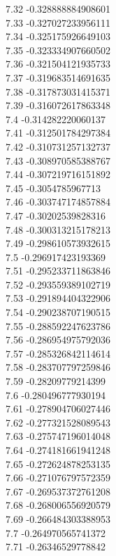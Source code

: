 {7.32	-0.328888884908601\\
7.33	-0.327027233956111\\
7.34	-0.325175926649103\\
7.35	-0.323334907660502\\
7.36	-0.321504121935733\\
7.37	-0.319683514691635\\
7.38	-0.317873031415371\\
7.39	-0.316072617863348\\
7.4	-0.314282220060137\\
7.41	-0.312501784297384\\
7.42	-0.310731257132737\\
7.43	-0.308970585388767\\
7.44	-0.307219716151892\\
7.45	-0.3054785967713\\
7.46	-0.303747174857884\\
7.47	-0.30202539828316\\
7.48	-0.300313215178213\\
7.49	-0.298610573932615\\
7.5	-0.296917423193369\\
7.51	-0.295233711863846\\
7.52	-0.293559389102719\\
7.53	-0.291894404322906\\
7.54	-0.290238707190515\\
7.55	-0.288592247623786\\
7.56	-0.286954975792036\\
7.57	-0.285326842114614\\
7.58	-0.283707797259846\\
7.59	-0.28209779214399\\
7.6	-0.280496777930194\\
7.61	-0.278904706027446\\
7.62	-0.277321528089543\\
7.63	-0.275747196014048\\
7.64	-0.274181661941248\\
7.65	-0.272624878253135\\
7.66	-0.271076797572359\\
7.67	-0.269537372761208\\
7.68	-0.268006556920579\\
7.69	-0.266484303388953\\
7.7	-0.264970565741372\\
7.71	-0.26346529778842\\
}
